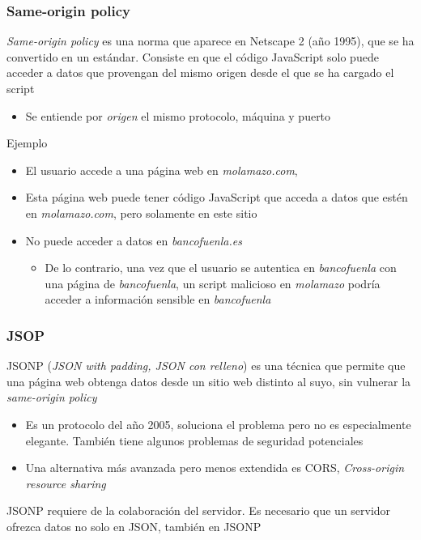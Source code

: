 \documentclass[ucs]{beamer}
\begin{document}
\begin{frame}[fragile]
\frametitle{Same-origin policy}

\emph{Same-origin policy}
es una norma que aparece en Netscape 2 (año 1995), que se ha convertido en un estándar.
Consiste en que el código JavaScript solo puede acceder a datos que provengan del mismo
origen desde el que se ha cargado el script


    \begin{itemize}
    \item
Se entiende por \emph{origen} el mismo protocolo, máquina y puerto
    \end{itemize}


Ejemplo

    \begin{itemize}
    \item
El usuario accede a una página web en
\emph{molamazo.com},

    \item
Esta página web puede tener código JavaScript que acceda a datos que estén en
\emph{molamazo.com},
pero
solamente en este sitio

    \item
No puede acceder a datos en
\emph{bancofuenla.es}


    \begin{itemize}
    \item
De lo contrario, una vez que el usuario se autentica en
\emph{bancofuenla}
con una página de
\emph{bancofuenla},
un script malicioso en
\emph{molamazo}
podría acceder a información sensible en
\emph{bancofuenla}
    \end{itemize}
    \end{itemize}


\end{frame}




\begin{frame}[fragile]
\frametitle{JSOP}

JSONP (\emph{JSON with padding, JSON con relleno})  es una técnica que permite que una página web obtenga datos desde un
sitio web distinto al suyo, sin vulnerar la
\emph{same-origin policy}


    \begin{itemize}
    \item
Es un protocolo del año 2005, soluciona el problema pero no es especialmente elegante. También tiene algunos
problemas de seguridad potenciales

    \item
Una alternativa más avanzada pero menos extendida es CORS,
\emph{Cross-origin resource sharing}
    \end{itemize}



JSONP
requiere de la colaboración del servidor. Es necesario que un servidor ofrezca datos no solo
en JSON, también en JSONP

\end{frame}
\end{document}
